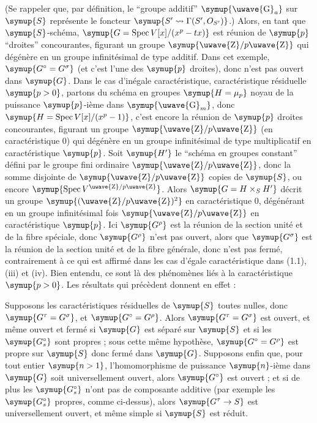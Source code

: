 (Se rappeler que, par définition, le ``groupe additif'' $\symup{\text{\uwave{G}}_a}$ sur $\symup{S}$
représente le foncteur $\symup{S'\rightsquigarrow\Gamma(S',O_{S'})}$.) Alors, en
tant que $\symup{S}$-schéma, $\symup{G=\operatorname{Spec}V[x]/(x^p-tx)}$ est réunion de $\symup{p}$ ``droites'' concourantes, figurant un groupe
$\symup{\text{\uwave{Z}}/p\text{\uwave{Z}}}$ qui dégénère en un groupe infinitésimal de type additif.
Dans cet exemple, $\symup{G^\circ=G^\sigma}$ (et c'est l'une des $\symup{p}$ droites), donc
n'est pas ouvert dans $\symup{G}$. Dans le cas d'inégale caractéristique, caractéristique résiduelle $\symup{p>0}$, partons du schéma en groupes
$\symup{H=\mu_p}$ noyau de la puissance $\symup{p}$-ième dans $\symup{\text{\uwave{G}}_m}$, donc $\symup{H=\operatorname{Spec}V[x]/(x^p-1)}$, c'est encore la réunion de $\symup{p}$ droites concourantes, figurant un groupe
$\symup{\text{\uwave{Z}}/p\text{\uwave{Z}}}$ (en caractéristique 0) qui dégénère en un groupe
infinitésimal de type multiplicatif en caractéristique $\symup{p}$. Soit $\symup{H'}$ le
``schéma en groupes constant'' défini par le groupe fini ordinaire
$\symup{\text{\uwave{Z}}/p\text{\uwave{Z}}}$, donc la somme disjointe de $\symup{\text{\uwave{Z}}/p\text{\uwave{Z}}}$
copies de $\symup{S}$, ou encore $\symup{\operatorname{Spec}V^{\text{\uwave{Z}}/p\text{\uwave{Z}}}}$. Alors
$\symup{G=H\times_S H'}$ décrit un groupe $\symup{(\text{\uwave{Z}}/p\text{\uwave{Z}})^2}$ en
caractéristique 0, dégénérant en un groupe infinitésimal fois
$\symup{\text{\uwave{Z}}/p\text{\uwave{Z}}}$ en caractéristique $\symup{p}$. Ici $\symup{G^\rho}$ est la réunion de
la section unité et de la fibre spéciale, donc $\symup{G^\rho}$ n'est pas ouvert,
alors que $\symup{G^\sigma}$ est la réunion de la section unité et de la fibre
générale, donc n'est pas fermé, contrairement à ce qui est affirmé dans les
cas d'égale caractéristique dans (1.1), (iii) et (iv). Bien entendu, ce sont là
des phénomènes liés à la caractéristique $\symup{p>0}$. Les résultats qui précèdent
donnent en effet :

 Supposons les caractéristiques résiduelles de $\symup{S}$
toutes nulles, donc $\symup{G^\tau=G^\sigma}$, et $\symup{G^\circ=G^\rho}$. Alors
$\symup{G^\tau=G^\sigma}$ est ouvert, et même ouvert et fermé si $\symup{G}$ est séparé sur
$\symup{S}$ et si les $\symup{G_s^\circ}$ sont propres ; sous cette même hypothèse,
$\symup{G^\circ=G^\rho}$ est propre sur $\symup{S}$ donc fermé dans $\symup{G}$. Supposons enfin que,
pour tout entier $\symup{n>1}$, l'homomorphisme de puissance $\symup{n}$-ième dans $\symup{G}$ soit
universellement ouvert, alors $\symup{G^\circ}$ est ouvert ; et si de plus les
$\symup{G_s^\circ}$ n'ont pas de composante additive (par exemple les $\symup{G_s^\circ}$
propres, comme ci-dessus), alors $\symup{G^\tau\to S}$ est universellement
ouvert, et même simple si $\symup{S}$ est réduit.

